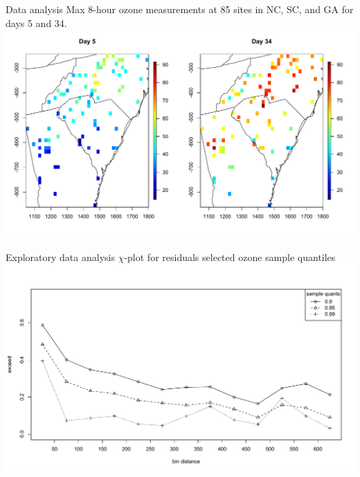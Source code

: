 \documentclass{beamer}
\begin{document}
\begin{frame}{Data analysis}
  \centering
  Max 8-hour ozone measurements at 85 sites in NC, SC, and GA for days 5 and 34.
    \includegraphics[width=1\linewidth]{./plots/ozone-day.pdf}

\end{frame}

\begin{frame}{Exploratory data analysis}
	\centering
	$\chi$-plot for residuals selected ozone sample quantiles
    \includegraphics[width=1\linewidth]{./plots/chi-plot-ozone-res.pdf}
\end{frame}
\end{document}
